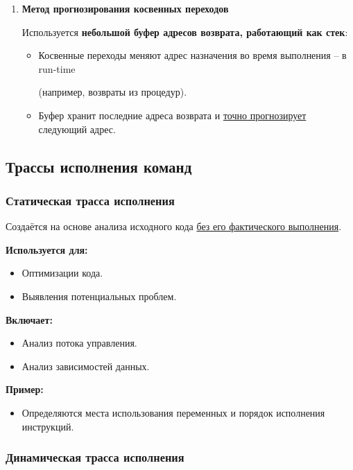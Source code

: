 \begin{enumerate}[leftmargin=1.35em]
		\item \textbf{Метод прогнозирования косвенных переходов}
		\par
		Используется \textbf{небольшой буфер адресов возврата, работающий как стек}:
		\begin{itemize}
			\item Косвенные переходы меняют адрес назначения во время выполнения -- в run-time 
			\par
			(например, возвраты из процедур).
			\item Буфер хранит последние адреса возврата и \uline{точно прогнозирует} следующий адрес.
		\end{itemize}
	\end{enumerate}
	
	\newpage
	
	\subsection{Трассы исполнения команд}
	
	\subsubsection{Статическая трасса исполнения}
	
	Создаётся на основе анализа исходного кода \uline{без его фактического выполнения}.
	
	\textbf{Используется для:}
	
	\begin{itemize}
		\item Оптимизации кода.
		\item Выявления потенциальных проблем.
	\end{itemize}
	
	\textbf{Включает:}
	
	\begin{itemize}
		\item Анализ потока управления.
		\item Анализ зависимостей данных.
	\end{itemize}
	
	\textbf{Пример:}
	\begin{itemize}
		\item Определяются места использования переменных и порядок исполнения инструкций.
	\end{itemize}
	
	\subsubsection{Динамическая трасса исполнения}
	

